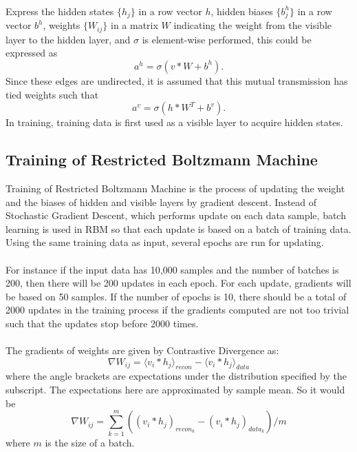 \documentclass[12pt]{article}
\begin{document}
\\
Express the hidden states $\{h_j\}$ in a row vector $h$, hidden biases $\{b^h_{j}\}$ in a row vector $b^ h$, weights $\{W_{ij}\}$ in a matrix $W$ indicating the weight from the visible layer to the hidden layer, and $\sigma$ is element-wise performed, this could be expressed as \begin{equation}
a^h =\sigma(v * W + b^h).
\end{equation}
Since these edges are undirected, it is assumed that this mutual transmission has tied weights such that 
\begin{equation}
a^v = \sigma(h * W^{T} + b^v).
\end{equation}
In training, training data is first used as a visible layer to acquire hidden states.
\subsection{Training of Restricted Boltzmann Machine}
Training of Restricted Boltzmann Machine is the process of updating the weight and the biases of hidden and visible layers by gradient descent. Instead of Stochastic Gradient Descent, which performs update on each data sample, batch learning is used in RBM so that each update is based on a batch of training data. Using the same training data as input, several epochs are run for updating. \\
\\
For instance if the input data has 10,000 samples and the number of batches is 200, then there will be 200 updates in each epoch.  For each update, gradients will be based on 50 samples. If the number of epochs is 10, there should be a total of 2000 updates in the training process if the gradients computed are not too trivial such that the updates stop before 2000 times.\\
\\
The gradients of weights are given by Contrastive Divergence as: \begin{equation}
\nabla W_{ij} = \langle v_i * h_j\rangle_{recon} - \langle v_i * h_j\rangle_{data}
\end{equation}
where the angle brackets are expectations under the distribution specified by the
subscript. The expectations here are approximated by sample mean. So it would be 
\begin{equation}
\nabla W_{ij} = \sum_{k = 1} ^ {m}((v_i * h_j)_{recon_k} - (v_i * h_j)_{data_k}) / m
\end{equation}
where $m$ is the size of a batch.\\
\end{document}
